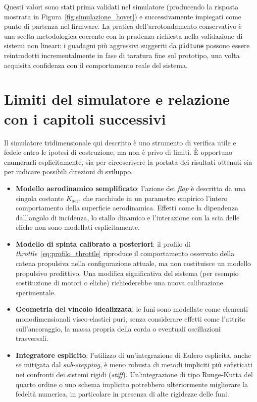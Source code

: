 \documentclass[11pt]{report}
\begin{document}
	Questi valori sono stati prima validati nel simulatore (producendo la risposta mostrata in Figura~\ref{fig:simulazione_hover}) e successivamente impiegati come punto di partenza nel firmware. La pratica dell'arrotondamento conservativo è una scelta metodologica coerente con la prudenza richiesta nella validazione di sistemi non lineari: i guadagni più aggressivi suggeriti da \texttt{pidtune} possono essere reintrodotti incrementalmente in fase di taratura fine sul prototipo, una volta acquisita confidenza con il comportamento reale del sistema.
	\section{Limiti del simulatore e relazione con i capitoli successivi}
	\label{sec:limiti_sim}
	
	Il simulatore tridimensionale qui descritto è uno strumento di verifica utile e fedele entro le ipotesi di costruzione, ma non è privo di limiti. È opportuno enumerarli esplicitamente, sia per circoscrivere la portata dei risultati ottenuti sia per indicare possibili direzioni di sviluppo.
	\begin{itemize}
		\item \textbf{Modello aerodinamico semplificato}: l'azione dei \textit{flap} è descritta da una singola costante $K_\text{aer}$, che racchiude in un parametro empirico l'intero comportamento della superficie aerodinamica. Effetti come la dipendenza dall'angolo di incidenza, lo stallo dinamico e l'interazione con la scia delle eliche non sono modellati esplicitamente.
		\item \textbf{Modello di spinta calibrato a posteriori}: il profilo di \textit{throttle}~\eqref{eq:profilo_throttle} riproduce il comportamento osservato della catena propulsiva nella configurazione attuale, ma non costituisce un modello propulsivo predittivo. Una modifica significativa del sistema (per esempio sostituzione di motori o eliche) richiederebbe una nuova calibrazione sperimentale.
		\item \textbf{Geometria del vincolo idealizzata}: le funi sono modellate come elementi monodimensionali visco-elastici puri, senza considerare effetti come l'attrito sull'ancoraggio, la massa propria della corda o eventuali oscillazioni trasversali.
		\item \textbf{Integratore esplicito}: l'utilizzo di un'integrazione di Eulero esplicita, anche se mitigata dal \textit{sub-stepping}, è meno robusta di metodi impliciti più sofisticati nei confronti dei sistemi rigidi (\textit{stiff}). Un'integrazione di tipo Runge-Kutta del quarto ordine o uno schema implicito potrebbero ulteriormente migliorare la fedeltà numerica, in particolare in presenza di alte rigidezze delle funi.
	\end{itemize}
	
\end{document}
